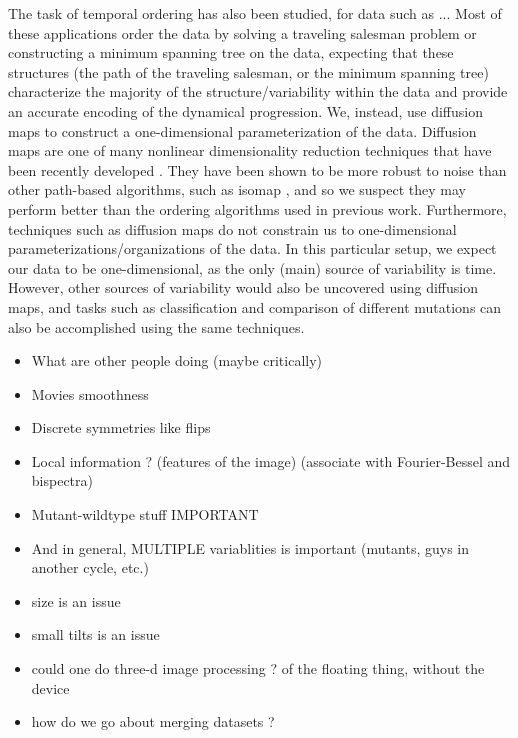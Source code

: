 \documentclass{pnastwo}
\begin{document}
\begin{article}
The task of temporal ordering has also been studied, for data such as ...
%
Most of these applications order the data by solving a traveling salesman problem or constructing a minimum spanning tree on the data,
expecting that these structures (the path of the traveling salesman, or the minimum spanning tree) characterize the majority of the structure/variability within the data and provide an accurate encoding of the dynamical progression.
%
We, instead, use diffusion maps to construct a one-dimensional parameterization of the data.
%
Diffusion maps are one of many nonlinear dimensionality reduction techniques that have been recently developed \cite{Belkin2003, tenenbaum2000global, Donoho2003, Roweis2000}.
%
They have been shown to be more robust to noise than other path-based algorithms, such as isomap \cite{balasubramanian2002isomap}, and so we suspect they may perform better than the ordering algorithms used in previous work.
% 
Furthermore, techniques such as diffusion maps do not constrain us to one-dimensional parameterizations/organizations of the data.
% 
In this particular setup, we expect our data to be one-dimensional, as the only (main) source of variability is time.
%
However, other sources of variability would also be uncovered using diffusion maps, 
and tasks such as classification and comparison of different mutations can also be accomplished using the same techniques. 


\begin{itemize}
\item What are other people doing  (maybe critically)
\item Movies  smoothness
\item Discrete symmetries like flips
\item Local information ? (features of the image) (associate with Fourier-Bessel and bispectra)
\item Mutant-wildtype stuff  IMPORTANT
\item And in general, MULTIPLE variablities is important (mutants, guys in another cycle, etc.)
 
\item size is an issue
\item  small tilts is an issue
\item   could one do three-d image processing ?  of the floating thing, without the device
\item how do we go about merging datasets ?
\end{itemize}






\end{article}
\end{document}
